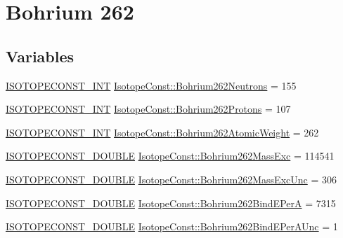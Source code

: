 \hypertarget{group___isotope_const-_bohrium-_bh262}{}\section{Bohrium 262}
\label{group___isotope_const-_bohrium-_bh262}
\subsection*{Variables}
\begin{DoxyCompactItemize}
\item 
\mbox{\hyperlink{group___isotope_const-_macros_ga5f18360b3e99483a35c32d789e62621c}{I\+S\+O\+T\+O\+P\+E\+C\+O\+N\+S\+T\+\_\+\+I\+NT}} \mbox{\hyperlink{group___isotope_const-_bohrium-_bh262_ga6c7770036031493b9e5ec222c06522c5}{Isotope\+Const\+::\+Bohrium262\+Neutrons}} = 155
\item 
\mbox{\hyperlink{group___isotope_const-_macros_ga5f18360b3e99483a35c32d789e62621c}{I\+S\+O\+T\+O\+P\+E\+C\+O\+N\+S\+T\+\_\+\+I\+NT}} \mbox{\hyperlink{group___isotope_const-_bohrium-_bh262_ga5b453283e63d75d954c89ab1c3364646}{Isotope\+Const\+::\+Bohrium262\+Protons}} = 107
\item 
\mbox{\hyperlink{group___isotope_const-_macros_ga5f18360b3e99483a35c32d789e62621c}{I\+S\+O\+T\+O\+P\+E\+C\+O\+N\+S\+T\+\_\+\+I\+NT}} \mbox{\hyperlink{group___isotope_const-_bohrium-_bh262_ga6071f8f3d950c9bb2850f7fdcfd856c1}{Isotope\+Const\+::\+Bohrium262\+Atomic\+Weight}} = 262
\item 
\mbox{\hyperlink{group___isotope_const-_macros_ga8f45a7272ce02c0b4c65c44636ed719a}{I\+S\+O\+T\+O\+P\+E\+C\+O\+N\+S\+T\+\_\+\+D\+O\+U\+B\+LE}} \mbox{\hyperlink{group___isotope_const-_bohrium-_bh262_ga8ea1b76178026baf3ed4e27cea766cf1}{Isotope\+Const\+::\+Bohrium262\+Mass\+Exc}} = 114541
\item 
\mbox{\hyperlink{group___isotope_const-_macros_ga8f45a7272ce02c0b4c65c44636ed719a}{I\+S\+O\+T\+O\+P\+E\+C\+O\+N\+S\+T\+\_\+\+D\+O\+U\+B\+LE}} \mbox{\hyperlink{group___isotope_const-_bohrium-_bh262_ga14e0b0ee8496f5511980faf8db6687ae}{Isotope\+Const\+::\+Bohrium262\+Mass\+Exc\+Unc}} = 306
\item 
\mbox{\hyperlink{group___isotope_const-_macros_ga8f45a7272ce02c0b4c65c44636ed719a}{I\+S\+O\+T\+O\+P\+E\+C\+O\+N\+S\+T\+\_\+\+D\+O\+U\+B\+LE}} \mbox{\hyperlink{group___isotope_const-_bohrium-_bh262_ga068ca92b9e6ef8815eaefd7495d6f7a5}{Isotope\+Const\+::\+Bohrium262\+Bind\+E\+PerA}} = 7315
\item 
\mbox{\hyperlink{group___isotope_const-_macros_ga8f45a7272ce02c0b4c65c44636ed719a}{I\+S\+O\+T\+O\+P\+E\+C\+O\+N\+S\+T\+\_\+\+D\+O\+U\+B\+LE}} \mbox{\hyperlink{group___isotope_const-_bohrium-_bh262_gae039e2733af4f575ff5329f2a0da6e95}{Isotope\+Const\+::\+Bohrium262\+Bind\+E\+Per\+A\+Unc}} = 1

\end{DoxyCompactItemize}
